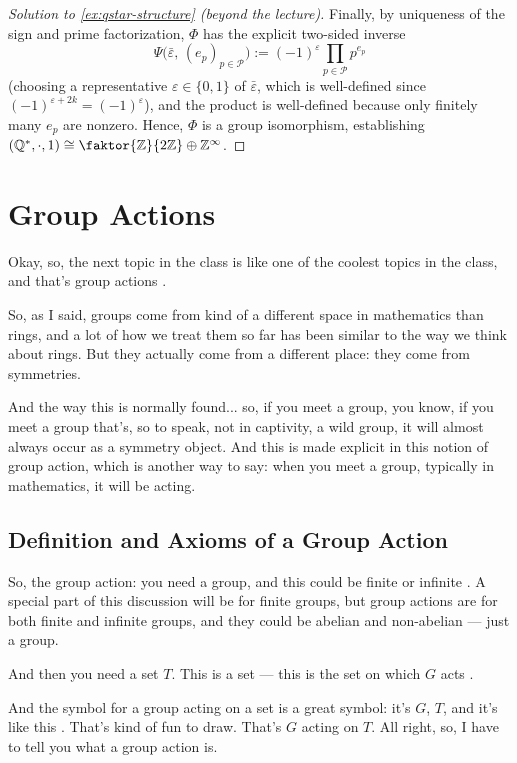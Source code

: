 \begin{content}
\begin{proof}[Solution to \cref{ex:qstar-structure} (beyond the lecture)]
Finally, by uniqueness of the sign and prime factorization, $\Phi$ has the explicit two-sided inverse
\[
\Psi\bigl(\bar{\varepsilon},\, (e_p)_{p \in \mathcal{P}}\bigr) := (-1)^{\varepsilon} \prod_{p \in \mathcal{P}} p^{e_p}
\]
(choosing a representative $\varepsilon \in \{0, 1\}$ of $\bar{\varepsilon}$, which is well-defined since $(-1)^{\varepsilon + 2k} = (-1)^{\varepsilon}$), and the product is well-defined because only finitely many $e_p$ are nonzero. Hence, $\Phi$ is a group isomorphism, establishing $(\mathbb{Q}^*, \cdot, 1) \cong \faktor{\mathbb{Z}}{2\mathbb{Z}} \oplus \mathbb{Z}^\infty$.
\end{proof}
\end{content}

\section{Group Actions}

\begin{speech}[00:43:32 - 00:44:23]
Okay, so, the next topic in the class is like one of the coolest topics in the class, and that's group actions .

So, as I said, groups come from kind of a different space in mathematics than rings, and a lot of how we treat them so far has been similar to the way we think about rings. But they actually come from a different place: they come from symmetries.

And the way this is normally found... so, if you meet a group, you know, if you meet a group that's, so to speak, not in captivity, a wild group, it will almost always occur as a symmetry object. And this is made explicit in this notion of group action, which is another way to say: when you meet a group, typically in mathematics, it will be acting.
\end{speech}

\subsection{Definition and Axioms of a Group Action}

\begin{speech}[00:44:24 - 00:45:05]
So, the group action: you need a group, and this could be finite or infinite . A special part of this discussion will be for finite groups, but group actions are for both finite and infinite groups, and they could be abelian and non-abelian --- just a group.

And then you need a set $T$. This is a set --- this is the set on which $G$ acts .

And the symbol for a group acting on a set is a great symbol: it's $G$, $T$, and it's like this . That's kind of fun to draw. That's $G$ acting on $T$. All right, so, I have to tell you what a group action is.
\end{speech}

